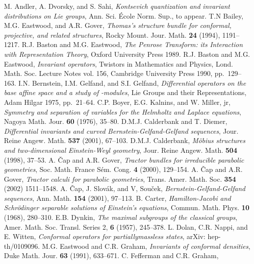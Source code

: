 \documentclass[a4paper,12pt]{amsart}
\begin{document}
\begin{thebibliography}{XX}
 M. Andler, A. Dvorsky, and S. Sahi,
{\em Kontsevich quantization and invariant distributions on Lie groups},
Ann. Sci. \'Ecole Norm. Sup., to appear.
 T.N Bailey, M.G. Eastwood, and A.R. Gover,
{\em Thomas's structure bundle for conformal, projective, and related
structures},
Rocky Mount. Jour. Math. {\bf 24} (1994), 1191--1217.
 R.J. Baston and M.G. Eastwood,
{\em The Penrose Transform: its Interaction with Representation Theory},
Oxford University Press 1989.
 R.J. Baston and M.G. Eastwood,
{\em Invariant operators},
Twistors in Mathematics and Physics,
Lond. Math. Soc. Lecture
Notes vol. 156, Cambridge University Press 1990, pp.~129--163.
 I.N. Bernstein, I.M. Gelfand, and S.I. Gelfand,
{\em Differential operators on the base affine space and a study of
\coordHE{}-modules},
Lie Groups and their Representations, Adam Hilgar 1975, pp.~21--64.
 C.P. Boyer, E.G. Kalnins, and W. Miller, jr,
{\em Symmetry and separation of variables for the Helmholtz and Laplace
equations},
Nagoya Math. Jour. {\bf 60} (1976), 35--80.
 D.M.J. Calderbank and T. Diemer,\quad
{\em Differential invariants and curved Bernstein-Gelfand-Gelfand sequences},
Jour. Reine Angew. Math. {\bf 537} (2001), 67--103.
 D.M.J. Calderbank,
{\em M\"obius structures and two-dimensional Einstein-Weyl geometry},
Jour. Reine Angew. Math. {\bf 504} (1998), 37--53.
 A. \v{C}ap and A.R. Gover,
{\em Tractor bundles for irreducible parabolic geometries},
Soc. Math. France S\'em. Cong. {\bf 4} (2000), 129--154.
 A. \v{C}ap and A.R. Gover,
{\em Tractor calculi for parabolic geometries},
Trans. Amer. Math. Soc. {\bf 354} (2002) 1511--1548.
 A. \v{C}ap, J. Slov\'ak, and V, Sou\v{c}ek,
{\em Bernstein-Gelfand-Gelfand sequences},
Ann. Math. {\bf 154} (2001), 97--113.
 B. Carter,
{\em Hamilton-Jacobi and Schr\"odinger separable solutions of Einstein's
equations},
Commun. Math. Phys. {\bf 10} (1968), 280--310.
 E.B. Dynkin, {\em The maximal subgroups of the classical groups},
Amer. Math. Soc. Transl. Series 2, {\bf 6} (1957), 245--378.
 L. Dolan, C.R. Nappi, and E. Witten,
{\em Conformal operators for partially\linebreak massless states},
arXiv: hep-th/0109096.
 M.G. Eastwood and C.R. Graham,
{\em Invariants of conformal densities},
Duke Math. Jour. {\bf 63} (1991), 633--671.
 C. Fefferman and C.R. Graham,

\end{thebibliography}
\end{document}
